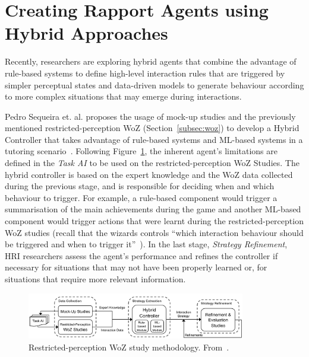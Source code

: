 \section{Creating Rapport Agents using Hybrid Approaches}

Recently, researchers are exploring hybrid agents that combine the advantage of rule-based systems to define high-level interaction rules that are triggered by simpler perceptual states and data-driven models to generate behaviour according to more complex situations that may emerge during interactions.

Pedro Sequeira et. al. proposes the usage of mock-up studies and the previously mentioned restricted-perception \ac{WoZ} (Section~\ref{subsec:woz}) to develop a Hybrid Controller that takes advantage of rule-based systems and \ac{ML}-based systems in a tutoring scenario~\cite{Sequeira2016}. Following Figure~\ref{fig:RestrictedPerception_DesignProcess}, the inherent agent's limitations are defined in the \textit{Task AI} to be used on the restricted-perception \ac{WoZ} Studies. The hybrid controller is based on the expert knowledge and the \ac{WoZ} data collected during the previous stage, and is responsible for deciding when and which behaviour to trigger. For example, a rule-based component would trigger a summarisation of the main achievements during the game and another \ac{ML}-based component would trigger actions that were learnt during the restricted-perception \ac{WoZ} studies (recall that the wizards controls ``which interaction behaviour should be triggered and when to trigger it''~\cite{Sequeira2016}). In the last stage, \textit{Strategy Refinement}, \ac{HRI} researchers assess the agent's performance and refines the controller if necessary for situations that may not have been properly learned or, for situations that require more relevant information.

\begin{figure}[H]
	\centering
	\includegraphics[width=0.85\textwidth]{images/RestrictedPerception_DesignProcess.png}
	\caption{Restricted-perception \ac{WoZ} study methodology. From~\cite{Sequeira2016}.}
	\label{fig:RestrictedPerception_DesignProcess}
\end{figure}






